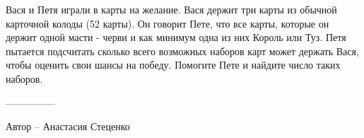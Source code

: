 \question
Вася и Петя играли в карты на желание. Вася держит три карты из обычной карточной колоды (52 карты). Он говорит Пете, что все карты, которые он держит одной масти - черви и как минимум одна из них Король или Туз. Петя пытается подсчитать сколько всего возможных наборов карт может держать Вася, чтобы оценить свои шансы на победу. Помогите Пете и найдите число таких наборов.

---------------

Автор -- Анастасия Стеценко
